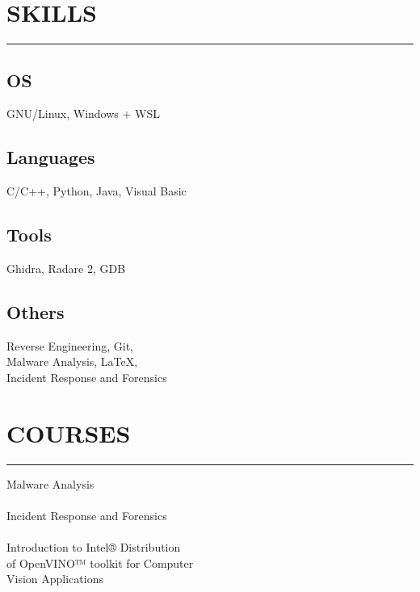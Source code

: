 \documentclass[]{resume}
\begin{document}
\begin{minipage}[t]{0.33\textwidth}

    \section{SKILLS}
    \noindent\rule{5 cm}{0.4pt}

    \subsection{OS}
    \noindent GNU/Linux, Windows + WSL

    \vspace{6pt}
    \subsection{Languages}
    \noindent C/C++, Python, Java, Visual Basic

    \vspace{6pt}
    \subsection{Tools}
    \noindent Ghidra, Radare 2, GDB

    \vspace{6pt}
    \subsection{Others}
    \noindent Reverse Engineering, Git,\\
    Malware Analysis, LaTeX,\\
    Incident Response and Forensics


    \section{COURSES}
    \noindent\rule{5cm}{0.4pt}

    \noindent Malware Analysis\\
    \noindent {}\\

    \vspace{6pt}
    \noindent Incident Response and Forensics\\
    \noindent {}\\

    \vspace{6pt}
    \noindent Introduction to Intel® Distribution\\
    of OpenVINO™ toolkit for Computer\\
    Vision Applications\\
    \noindent {}\\

\end{minipage}
\end{document}
